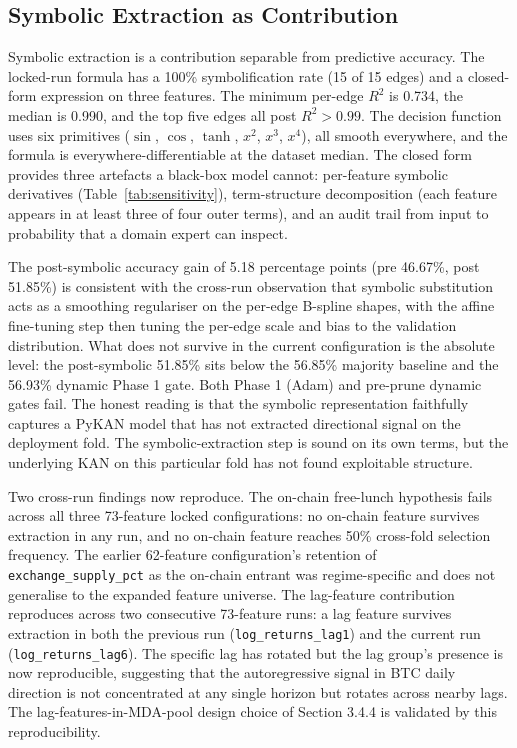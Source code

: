 \documentclass[12pt,a4paper,oneside]{article}
\begin{document}
\subsection{Symbolic Extraction as Contribution}\label{subsec:disc_symbolic}

Symbolic extraction is a contribution separable from predictive accuracy. The locked-run formula has a 100\% symbolification rate (15 of 15 edges) and a closed-form expression on three features. The minimum per-edge $R^2$ is 0.734, the median is 0.990, and the top five edges all post $R^2 > 0.99$. The decision function uses six primitives ($\sin$, $\cos$, $\tanh$, $x^2$, $x^3$, $x^4$), all smooth everywhere, and the formula is everywhere-differentiable at the dataset median. The closed form provides three artefacts a black-box model cannot: per-feature symbolic derivatives (Table~\ref{tab:sensitivity}), term-structure decomposition (each feature appears in at least three of four outer terms), and an audit trail from input to probability that a domain expert can inspect.

The post-symbolic accuracy gain of 5.18 percentage points (pre 46.67\%, post 51.85\%) is consistent with the cross-run observation that symbolic substitution acts as a smoothing regulariser on the per-edge B-spline shapes, with the affine fine-tuning step then tuning the per-edge scale and bias to the validation distribution. What does not survive in the current configuration is the absolute level: the post-symbolic 51.85\% sits below the 56.85\% majority baseline and the 56.93\% dynamic Phase 1 gate. Both Phase 1 (Adam) and pre-prune dynamic gates fail. The honest reading is that the symbolic representation faithfully captures a PyKAN model that has not extracted directional signal on the deployment fold. The symbolic-extraction step is sound on its own terms, but the underlying KAN on this particular fold has not found exploitable structure.

Two cross-run findings now reproduce. The on-chain free-lunch hypothesis fails across all three 73-feature locked configurations: no on-chain feature survives extraction in any run, and no on-chain feature reaches 50\% cross-fold selection frequency. The earlier 62-feature configuration's retention of \texttt{exchange\_supply\_pct} as the on-chain entrant was regime-specific and does not generalise to the expanded feature universe. The lag-feature contribution reproduces across two consecutive 73-feature runs: a lag feature survives extraction in both the previous run (\texttt{log\_returns\_lag1}) and the current run (\texttt{log\_returns\_lag6}). The specific lag has rotated but the lag group's presence is now reproducible, suggesting that the autoregressive signal in BTC daily direction is not concentrated at any single horizon but rotates across nearby lags. The lag-features-in-MDA-pool design choice of Section 3.4.4 is validated by this reproducibility.
\end{document}
